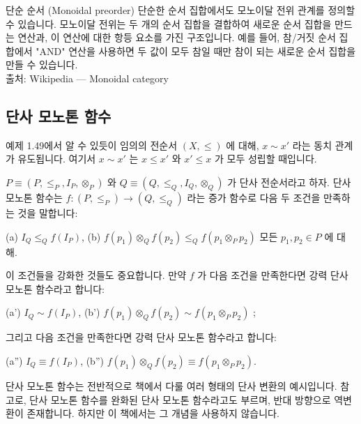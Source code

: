 \documentclass[11pt, a4paper, twoside, openany]{book}
\begin{document}
{\begin{deepresearch}{단순 순서 (Monoidal preorder)}
단순한 순서 집합에서도 모노이달 전위 관계를 정의할 수 있습니다.  모노이달 전위는 두 개의 순서 집합을 결합하여 새로운 순서 집합을 만드는 연산과, 이 연산에 대한 항등 요소를 가진 구조입니다. 예를 들어, 참/거짓 순서 집합에서 "AND" 연산을 사용하면 두 값이 모두 참일 때만 참이 되는 새로운 순서 집합을 만들 수 있습니다.
\\[4pt]{\footnotesize\color{ctgray} 출처: Wikipedia — Monoidal category}
\end{deepresearch}


\subsection{단사 모노톤 함수}
\label{sec:2-2-5}

예제 1.49\hspace{0pt}에서 알 수 있듯이 임의의 전순서 $(X, \le)$ 에 대해, $x \sim x'$ 라는 동치 관계가 유도됩니다. 여기서 $x \sim x'$ 는 $x \le x'$ 와 $x' \le x$ 가 모두 성립할 때입니다.

\par\medskip
\begin{definitionbox}[정의 2.41.]
$P \equiv (P, \le_P, I_P, \otimes_P)$ 와 $Q \equiv (Q, \le_Q, I_Q, \otimes_Q)$ 가 단사 전순서라고 하자.  
단사 모노톤 함수는 $f : (P, \le_P) \to (Q, \le_Q)$ 라는 증가 함수로 다음 두 조건을 만족하는 것을 말합니다:
\end{definitionbox}

\par\medskip
(a) $I_Q \le_Q f(I_P)$, 
(b) $f(p_1) \otimes_Q f(p_2) \le_Q f(p_1 \otimes_P p_2)$ 모든 $p_1, p_2 \in P$ 에 대해.

\par\medskip
이 조건들을 강화한 것들도 중요합니다. 만약 $f$ 가 다음 조건을 만족한다면 강력 단사 모노톤 함수라고 합니다:

\par\medskip
(a') $I_Q \sim f(I_P)$, 
(b') $f(p_1) \otimes_Q f(p_2) \sim f(p_1 \otimes_P p_2)$ ;

\par\medskip
그리고 다음 조건을 만족한다면 강력 단사 모노톤 함수라고 합니다:

\par\medskip
(a'') $I_Q \equiv f(I_P)$, 
(b'') $f(p_1) \otimes_Q f(p_2) \equiv f(p_1 \otimes_P p_2)$.

\par\medskip
단사 모노톤 함수는 전반적으로 책에서 다룰 여러 형태의 단사 변환의 예시입니다. 참고로, 단사 모노톤 함수를 완화된 단사 모노톤 함수라고도 부르며, 반대 방향으로 역변환이 존재합니다. 하지만 이 책에서는 그 개념을 사용하지 않습니다.

}
\end{document}
